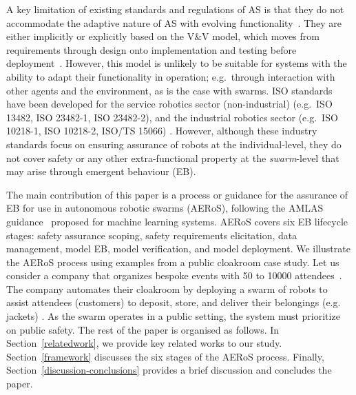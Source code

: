 \documentclass[runningheads]{llncs}
\begin{document}
A key limitation of existing standards and regulations of AS is that they do not accommodate the adaptive nature of AS with evolving functionality~\cite{Fisher2020}. 
They are either implicitly or explicitly based on the V\&V model, which moves from requirements through design onto implementation and testing before deployment~\cite{Jia2021}. 
However, this model is unlikely to be suitable for systems with the ability to adapt their functionality in operation; e.g.\ through interaction with other agents and the environment, as is the case with swarms. 
ISO standards have been developed for the service robotics sector (non-industrial) (e.g.\ ISO 13482, ISO 23482-1, ISO 23482-2), and the industrial robotics sector (e.g.\ ISO 10218-1, ISO 10218-2, ISO/TS 15066) \cite{Abeywickrama2022}. 
However, although these industry standards focus on ensuring assurance of robots at the individual-level, they do not cover safety or any other extra-functional property at the \emph{swarm}-level that may arise through emergent behaviour (EB). %


The main contribution of this paper is a process or guidance for the assurance of EB for use in autonomous robotic swarms (AERoS), following the AMLAS guidance~\cite{Hawkins2021} proposed for machine learning systems. 
AERoS covers six EB lifecycle stages: safety assurance scoping, safety requirements elicitation, data management, model EB, model verification, and model deployment. 
We illustrate the AERoS process using examples from a public cloakroom case study. 
Let us consider a company that organizes bespoke events with 50 to 10000 attendees~\cite{Jia2021}. 
The company automates their cloakroom by deploying a swarm of robots to assist attendees (customers) to deposit, store, and deliver their belongings (e.g. jackets) \cite{Jones2020}. 
As the swarm operates in a public setting, the system must prioritize on public safety. 
The rest of the paper is organised as follows. 
In Section~\ref{relatedwork}, we provide key related works to our study. Section~\ref{framework} discusses the six stages of the AERoS process. Finally, Section~\ref{discussion-conclusions} provides a brief discussion and concludes the paper. 
%
%
\end{document}
